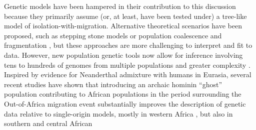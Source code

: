 \documentclass[]{article}
\begin{document}
Genetic models have been hampered in their contribution to this discussion
because they primarily assume (or, at least, have been tested under) a
tree-like model of isolation-with-migration. Alternative theoretical scenarios
have been proposed, such as stepping stone models \citep{Arredondo2021-qa} or
population coalescence and fragmentation \citep{Scerri2019-xg}, but these
approaches are more challenging to interpret and fit to data.  However, new
population genetic tools now allow for inference involving tens to hundreds of
genomes from multiple populations and greater complexity
\citep{Kamm2020-vn,Ragsdale2019-nt,Speidel2019-nj}. Inspired by evidence for
Neanderthal admixture with humans in Eurasia, several recent studies have shown
that introducing an archaic hominin ``ghost'' population contributing to
African populations in the period surrounding the Out-of-Africa migration event
substantially improves the description of genetic data relative to
single-origin models, mostly in western Africa
\citep{Plagnol2006-lt,Hammer2011-bx,Hey2018-pw,Ragsdale2019-nt,
Lorente-Galdos2019-vz,Durvasula2020-td},
%
%
%
%
%
but also in southern \cite{Hammer2011-bx,Lorente-Galdos2019-vz} and central
African \cite{Hsieh2016-gk, Hammer2011-bx,Lorente-Galdos2019-vz,Hey2018-pw}
\end{document}

